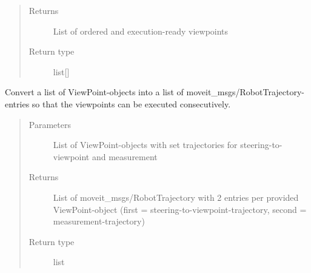 \documentclass[letterpaper,10pt,english]{sphinxmanual}
\begin{document}
\begin{fulllineitems}
\begin{fulllineitems}
\begin{quote}
\begin{description}
\item[{Returns}] \leavevmode
List of ordered and execution-ready viewpoints

\item[{Return type}] \leavevmode
list{[}{\hyperref[\detokenize{module_view:agiprobot_measurement.viewpoint.ViewPoint}]{}}{]}

\end{description}\end{quote}

\end{fulllineitems}


\begin{fulllineitems}
\label{\detokenize{module_trajectory_manager:agiprobot_measurement.trajectory_manager.TrajectoryManager.convert_viewpointlist_to_execution_plan}}
Convert a list of ViewPoint-objects into a list of moveit\_msgs/RobotTrajectory-entries so that the viewpoints can be executed consecutively.
\begin{quote}\begin{description}
\item[{Parameters}] \leavevmode
{} \textendash{} List of ViewPoint-objects with set trajectories for steering-to-viewpoint and measurement

\item[{Returns}] \leavevmode
List of moveit\_msgs/RobotTrajectory with 2 entries per provided ViewPoint-object (first = steering-to-viewpoint-trajectory, second = measurement-trajectory)

\item[{Return type}] \leavevmode
list

\end{description}\end{quote}

\end{fulllineitems}



\end{fulllineitems}
\end{document}

